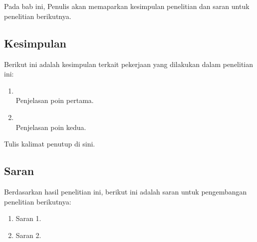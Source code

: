 \chapter{\kesimpulan}
Pada bab ini, Penulis akan memaparkan kesimpulan penelitian dan saran untuk penelitian berikutnya.


\section{Kesimpulan}
Berikut ini adalah kesimpulan terkait pekerjaan yang dilakukan dalam penelitian ini:
\begin{enumerate}
	\item {} \\
	Penjelasan poin pertama.
	\item {} \\
	Penjelasan poin kedua.
\end{enumerate}

Tulis kalimat penutup di sini.


\section{Saran}
Berdasarkan hasil penelitian ini, berikut ini adalah saran untuk pengembangan penelitian berikutnya:
\begin{enumerate}
	\item Saran 1.
	\item Saran 2.
\end{enumerate}
